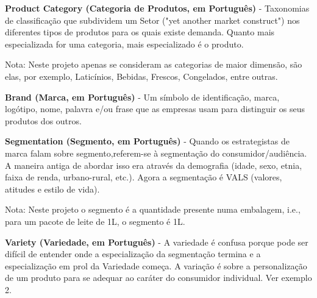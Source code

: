 
\vspace{0.2cm}
\textbf{Product Category (Categoria de Produtos, em Português)} - Taxonomias de classificação que subdividem um Setor ("yet another market construct") nos diferentes tipos de produtos para os quais existe demanda. Quanto mais especializada for uma categoria, mais especializado é o produto. 

{\footnotesize Nota: Neste projeto apenas se consideram as categorias de maior dimensão, são elas, por exemplo, Laticínios, Bebidas, Frescos, Congelados, entre outras.}


\vspace{0.2cm}
\textbf{Brand (Marca, em Português)} - Um símbolo de identificação, marca, logótipo, nome, palavra e/ou frase que as empresas usam para distinguir os seus produtos dos outros.

 
\vspace{0.2cm}
\textbf{Segmentation (Segmento, em Português)} - Quando os estrategistas de marca falam sobre segmento,referem-se à segmentação do consumidor/audiência. A maneira antiga de abordar isso era através da demografia (idade, sexo, etnia, faixa de renda, urbano-rural, etc.). Agora a segmentação é VALS (valores, atitudes e estilo de vida). 

{\footnotesize Nota: Neste projeto o segmento é a quantidade presente numa embalagem, i.e., para um pacote de leite de 1L, o segmento é 1L.}


\vspace{0.2cm}
\textbf{Variety (Variedade, em Português)} - A variedade é confusa porque pode ser difícil de entender onde a especialização da segmentação termina e a especialização em prol da Variedade começa. A variação é sobre a personalização de um produto para se adequar ao caráter do consumidor individual. Ver exemplo 2.

\vspace{0.5cm}




